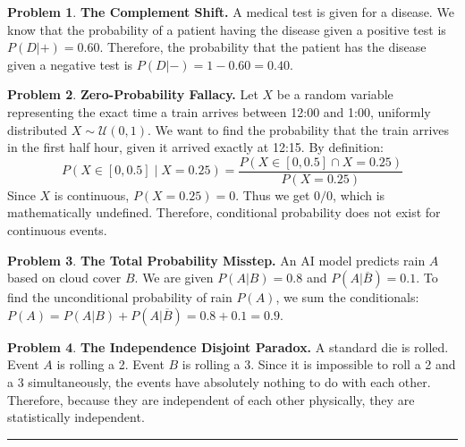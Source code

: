 \documentclass[11pt, letterpaper]{article}
\theoremstyle{definition}
\newtheorem{problem}{Problem}
\begin{document}
\begin{problem}
\textbf{The Complement Shift.}
A medical test is given for a disease. We know that the probability of a patient having the disease given a positive test is $P(D|+) = 0.60$. Therefore, the probability that the patient has the disease given a negative test is $P(D|-) = 1 - 0.60 = 0.40$.
\end{problem}

\begin{problem}
\textbf{Zero-Probability Fallacy.}
Let $X$ be a random variable representing the exact time a train arrives between 12:00 and 1:00, uniformly distributed $X \sim \mathcal{U}(0,1)$. We want to find the probability that the train arrives in the first half hour, given it arrived exactly at 12:15. By definition:
\[ P(X \in [0, 0.5] \mid X = 0.25) = \frac{P(X \in [0, 0.5] \cap X = 0.25)}{P(X = 0.25)} \]
Since $X$ is continuous, $P(X = 0.25) = 0$. Thus we get $0 / 0$, which is mathematically undefined. Therefore, conditional probability does not exist for continuous events.
\end{problem}

\begin{problem}
\textbf{The Total Probability Misstep.}
An AI model predicts rain $A$ based on cloud cover $B$. We are given $P(A|B) = 0.8$ and $P(A|\overline{B}) = 0.1$. To find the unconditional probability of rain $P(A)$, we sum the conditionals: $P(A) = P(A|B) + P(A|\overline{B}) = 0.8 + 0.1 = 0.9$.
\end{problem}

\begin{problem}
\textbf{The Independence Disjoint Paradox.}
A standard die is rolled. Event $A$ is rolling a 2. Event $B$ is rolling a 3. Since it is impossible to roll a 2 and a 3 simultaneously, the events have absolutely nothing to do with each other. Therefore, because they are independent of each other physically, they are statistically independent.
\end{problem}

\vspace{0.5cm}
\hrule
\vspace{0.5cm}
\end{document}

